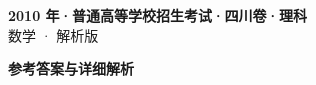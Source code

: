 \documentclass[zihao=-4, a4paper]{ctexart}
\begin{document}
\begin{center}
  {\Large\bfseries 2010 年·普通高等学校招生考试·四川卷·理科}\\[4pt]
  {\large 数学 · 解析版}
\end{center}
\medskip
{}

\clearpage
{}
\begin{center}{\Large\bfseries 参考答案与详细解析}\end{center}
\medskip

\end{document}
